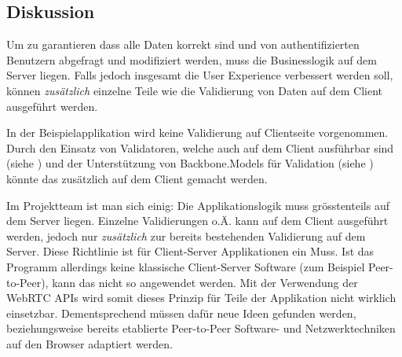 \subsection*{Diskussion}
Um zu garantieren dass alle Daten korrekt sind und von authentifizierten Benutzern abgefragt und modifiziert werden, muss die Businesslogik auf dem Server liegen.
Falls jedoch insgesamt die User Experience verbessert werden soll, können \emph{zusätzlich} einzelne Teile wie die Validierung von Daten auf dem Client ausgeführt werden.

In der Beispielapplikation wird keine Validierung auf Clientseite vorgenommen. Durch den Einsatz von Validatoren, welche auch auf dem Client ausführbar sind (siehe \cite{nodevalidator}) und der Unterstützung von Backbone.Models für Validation (siehe \cite{BackboneModelValidation}) könnte das zusätzlich auf dem Client gemacht werden.

Im Projektteam ist man sich einig: Die Applikationslogik muss grösstenteils auf dem Server liegen. Einzelne Validierungen o.Ä. kann auf dem Client ausgeführt werden, jedoch nur \emph{zusätzlich} zur bereits bestehenden Validierung auf dem Server.
Diese Richtlinie ist für Client-Server Applikationen ein Muss. Ist das Programm allerdings keine klassische Client-Server Software (zum Beispiel Peer-to-Peer), kann das nicht so angewendet werden.
Mit der Verwendung der \gls{WebRTC} APIs \cite{WebRTC} wird somit dieses Prinzip für Teile der Applikation nicht wirklich einsetzbar. Dementsprechend müssen dafür neue Ideen gefunden werden, beziehungsweise bereits etablierte Peer-to-Peer Software- und Netzwerktechniken auf den Browser adaptiert werden.